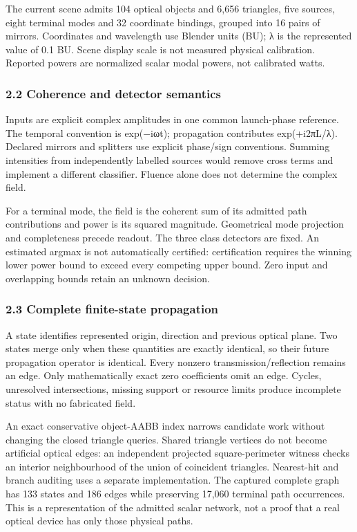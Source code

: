 \documentclass[
  10pt,
]{article}
\begin{document}
The current scene admits 104 optical objects and 6,656 triangles, five
sources, eight terminal modes and 32 coordinate bindings, grouped into
16 pairs of mirrors. Coordinates and wavelength use Blender units (BU);
λ is the represented value of 0.1 BU. Scene display scale is not
measured physical calibration. Reported powers are normalized scalar
modal powers, not calibrated watts.

\hypertarget{coherence-and-detector-semantics}{%
\subsubsection{2.2 Coherence and detector
semantics}\label{coherence-and-detector-semantics}}

Inputs are explicit complex amplitudes in one common launch-phase
reference. The temporal convention is exp(−iωt); propagation contributes
exp(+i2πL/λ). Declared mirrors and splitters use explicit phase/sign
conventions. Summing intensities from independently labelled sources
would remove cross terms and implement a different classifier. Fluence
alone does not determine the complex field.

For a terminal mode, the field is the coherent sum of its admitted path
contributions and power is its squared magnitude. Geometrical mode
projection and completeness precede readout. The three class detectors
are fixed. An estimated argmax is not automatically certified:
certification requires the winning lower power bound to exceed every
competing upper bound. Zero input and overlapping bounds retain an
unknown decision.

\hypertarget{complete-finite-state-propagation}{%
\subsubsection{2.3 Complete finite-state
propagation}\label{complete-finite-state-propagation}}

A state identifies represented origin, direction and previous optical
plane. Two states merge only when these quantities are exactly
identical, so their future propagation operator is identical. Every
nonzero transmission/reflection remains an edge. Only mathematically
exact zero coefficients omit an edge. Cycles, unresolved intersections,
missing support or resource limits produce incomplete status with no
fabricated field.

An exact conservative object-AABB index narrows candidate work without
changing the closed triangle queries. Shared triangle vertices do not
become artificial optical edges: an independent projected
square-perimeter witness checks an interior neighbourhood of the union
of coincident triangles. Nearest-hit and branch auditing uses a separate
implementation. The captured complete graph has 133 states and 186 edges
while preserving 17,060 terminal path occurrences. This is a
representation of the admitted scalar network, not a proof that a real
optical device has only those physical paths.
\end{document}
